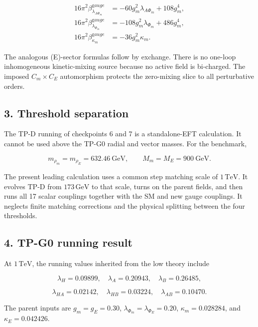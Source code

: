 \documentclass[
]{article}
\begin{document}
\[
\begin{aligned}
16\pi^2\beta_{\lambda_{A\Phi_m}}^{\mathrm gauge}
&=-60g_m^2\lambda_{A\Phi_m}+108g_m^4,\\
16\pi^2\beta_{\lambda_{\Phi_m}}^{\mathrm gauge}
&=-108g_m^2\lambda_{\Phi_m}+486g_m^4,\\
16\pi^2\beta_{\kappa_m}^{\mathrm gauge}
&=-36g_m^2\kappa_m.
\end{aligned}
\]

The analogous (E)-sector formulas follow by exchange. There is no
one-loop inhomogeneous kinetic-mixing source because no active field is
bi-charged. The imposed \(C_m\times C_E\) automorphism protects the
zero-mixing slice to all perturbative orders.

\hypertarget{threshold-separation}{%
\subsection{3. Threshold separation}\label{threshold-separation}}

The TP-D running of checkpoints 6 and 7 is a standalone-EFT calculation.
It cannot be used above the TP-G0 radial and vector masses. For the
benchmark,

\[
m_{\rho_m}=m_{\rho_E}=632.46\ \mathrm{GeV},\qquad
M_m=M_E=900\ \mathrm{GeV}.
\]

The present leading calculation uses a common step matching scale of
\(1\,\mathrm{TeV}\). It evolves TP-D from \(173\,\mathrm{GeV}\) to that
scale, turns on the parent fields, and then runs all 17 scalar couplings
together with the SM and new gauge couplings. It neglects finite
matching corrections and the physical splitting between the four
thresholds.

\hypertarget{tp-g0-running-result}{%
\subsection{4. TP-G0 running result}\label{tp-g0-running-result}}

At \(1\,\mathrm{TeV}\), the running values inherited from the low theory
include

\[
\lambda_H=0.09899,\quad
\lambda_A=0.20943,\quad
\lambda_B=0.26485,
\]

\[
\lambda_{HA}=0.02142,\quad
\lambda_{HB}=0.03224,\quad
\lambda_{AB}=0.10470.
\]

The parent inputs are \(g_m=g_E=0.30\),
\(\lambda_{\Phi_m}=\lambda_{\Phi_E}=0.20\), \(\kappa_m=0.028284\), and
\(\kappa_E=0.042426\).
\end{document}

